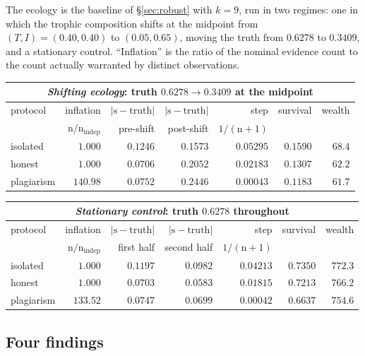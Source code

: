 \documentclass[11pt,a4paper]{article}
\theoremstyle{plain}
\theoremstyle{definition}
\theoremstyle{remark}
\newcommand{\str}{\mathrm{s}}
\newcommand{\ev}{\mathrm{n}}
\begin{document}
The ecology is the baseline of \S\ref{sec:robust} with $k = 9$, run in two
regimes: one in which the trophic composition shifts at the midpoint from
$(T,I) = (0.40,0.40)$ to $(0.05,0.65)$, moving the truth from $0.6278$ to
$0.3409$, and a stationary control. ``Inflation'' is the ratio of the nominal
evidence count to the count actually warranted by distinct observations.

\begin{center}
\begin{tabular}{lrrrrrr}
\multicolumn{7}{c}{\emph{Shifting ecology}: truth $0.6278 \to 0.3409$ at the
midpoint}\\[3pt]
\toprule
protocol & inflation & $|\str-\text{truth}|$ & $|\str-\text{truth}|$ &
step & survival & wealth \\
 & $\ev/\ev_{\mathrm{indep}}$ & pre-shift & post-shift & $1/(\ev+1)$ & & \\
\midrule
isolated & $1.000$ & $0.1246$ & $\mathbf{0.1573}$ & $0.05295$ & $0.1590$ & $68.4$ \\
honest & $1.000$ & $\mathbf{0.0706}$ & $0.2052$ & $0.02183$ & $0.1307$ & $62.2$ \\
plagiarism & $\mathbf{140.98}$ & $0.0752$ & $0.2446$ & $0.00043$ & $0.1183$ & $61.7$ \\
\bottomrule
\end{tabular}
\end{center}

\begin{center}
\begin{tabular}{lrrrrrr}
\multicolumn{7}{c}{\emph{Stationary control}: truth $0.6278$ throughout}\\[3pt]
\toprule
protocol & inflation & $|\str-\text{truth}|$ & $|\str-\text{truth}|$ &
step & survival & wealth \\
 & $\ev/\ev_{\mathrm{indep}}$ & first half & second half & $1/(\ev+1)$ & & \\
\midrule
isolated & $1.000$ & $0.1197$ & $0.0982$ & $0.04213$ & $0.7350$ & $772.3$ \\
honest & $1.000$ & $\mathbf{0.0703}$ & $\mathbf{0.0583}$ & $0.01815$ & $0.7213$ & $766.2$ \\
plagiarism & $133.52$ & $0.0747$ & $0.0699$ & $0.00042$ & $0.6637$ & $754.6$ \\
\bottomrule
\end{tabular}
\end{center}

\subsection{Four findings}
\end{document}
